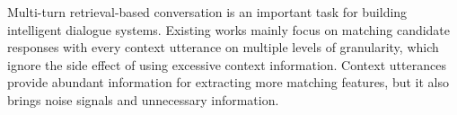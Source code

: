 Multi-turn retrieval-based conversation is an important task for building intelligent dialogue systems. Existing works mainly focus on matching candidate responses with every context utterance on multiple levels of granularity, which ignore the side effect of using excessive context information. Context utterances provide abundant information for extracting more matching features, but it also brings noise signals and unnecessary information.